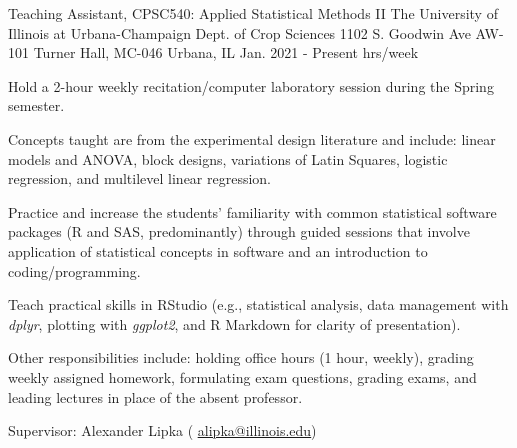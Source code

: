 \begin{cventries}
  \cventry
    {Teaching Assistant, CPSC540: Applied Statistical Methods II} %
    {The University of Illinois at Urbana-Champaign \newline Dept. of Crop Sciences } %
    {1102 S. Goodwin Ave \newline AW-101 Turner Hall, MC-046 \newline
    Urbana, IL} %
    {Jan. 2021 - Present  hrs/week} %
    {
      \begin{cvitems} %
        \item {Hold a 2-hour weekly recitation/computer laboratory session during the Spring semester. }
        \item{Concepts taught are from the experimental design literature and include: linear models and ANOVA, block designs, variations of Latin Squares, logistic regression, and multilevel linear regression.}
        \item {Practice and increase the students’ familiarity with common statistical software packages (R and SAS, predominantly) through guided sessions that involve application of statistical concepts in software and an introduction to coding/programming.}
        \item{Teach practical skills in RStudio (e.g., statistical analysis, data management with \textit{dplyr}, plotting with \textit{ggplot2}, and R Markdown for clarity of presentation).}
        \item {Other responsibilities include: holding office hours (1 hour, weekly), grading weekly assigned homework, formulating exam questions, grading exams, and leading lectures in place of the absent professor.}
        \item {Supervisor: Alexander Lipka ( \textcolor{navyblue}{\underline{\href{mailto:alipka@illinois.edu}{alipka@illinois.edu}}})}
      \end{cvitems}
    }



\end{cventries}
